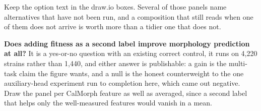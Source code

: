Keep the option text in the draw.io boxes. Several of those panels name alternatives that
have not been run, and a composition that still reads when one of them does not arrive is
worth more than a tidier one that does not.

 \textbf{Does adding fitness as a second label
improve morphology prediction at all?} It is a yes-or-no question with an existing correct
control, it runs on 4,220 strains rather than 1,440, and either answer is publishable: a
gain is the multi-task claim the figure wants, and a null is the honest counterweight to the
one auxiliary-head experiment run to completion here, which came out negative. Draw the panel
per CalMorph feature as well as averaged, since a second label that helps only the
well-measured features would vanish in a mean.
